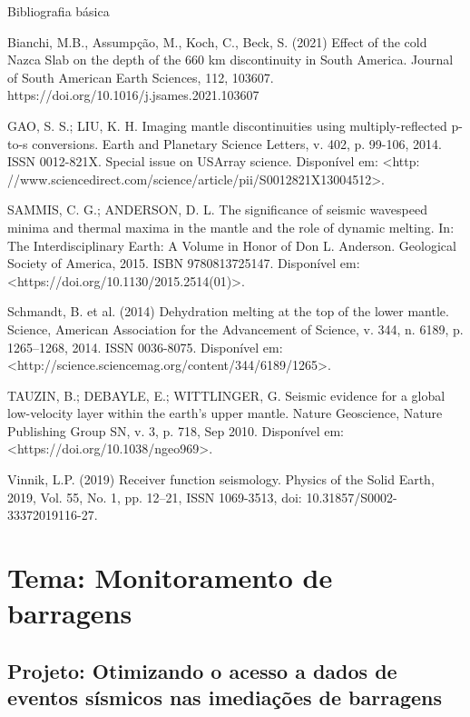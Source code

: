 \documentclass[10pt,a4paper,oneside]{book}
\begin{document}
\begin{fancyenum}{\faBook}{Bibliografia básica}
	\item Bianchi, M.B., Assumpção, M., Koch, C., Beck, S. (2021) Effect of the cold Nazca Slab on the depth of the 660 km discontinuity in South America. Journal of South American Earth Sciences, 112, 103607. https://doi.org/10.1016/j.jsames.2021.103607
	\item GAO, S. S.; LIU, K. H. Imaging mantle discontinuities using multiply-reflected p-to-s conversions. Earth and Planetary Science Letters, v. 402, p. 99-106,
2014. ISSN 0012-821X. Special issue on USArray science. Disponível em: <http: //www.sciencedirect.com/science/article/pii/S0012821X13004512>.
	\item SAMMIS, C. G.; ANDERSON, D. L. The significance of seismic wavespeed minima and thermal maxima in the mantle and the role of dynamic melting. In: The Interdisciplinary Earth: A Volume in Honor of Don L. Anderson. Geological Society of America, 2015. ISBN 9780813725147. Disponível em: <https://doi.org/10.1130/2015.2514(01)>.
	\item Schmandt, B. et al. (2014) Dehydration melting at the top of the lower mantle. Science, American Association for the Advancement of Science, v. 344, n. 6189, p. 1265–1268, 2014. ISSN 0036-8075. Disponível em: <http://science.sciencemag.org/content/344/6189/1265>.
	\item TAUZIN, B.; DEBAYLE, E.; WITTLINGER, G. Seismic evidence for a global low-velocity layer within the earth’s upper mantle. Nature Geoscience, Nature Publishing Group SN,
v. 3, p. 718, Sep 2010. Disponível em: <https://doi.org/10.1038/ngeo969>.
	\item Vinnik, L.P. (2019) Receiver function seismology. Physics of the Solid Earth, 2019, Vol. 55, No. 1, pp. 12–21, ISSN 1069-3513, doi: 10.31857/S0002-33372019116-27.
\end{fancyenum}


\section{Tema: Monitoramento de barragens}

\subsection{Projeto: Otimizando o acesso a dados de eventos sísmicos nas imediações de barragens}
\end{document}
